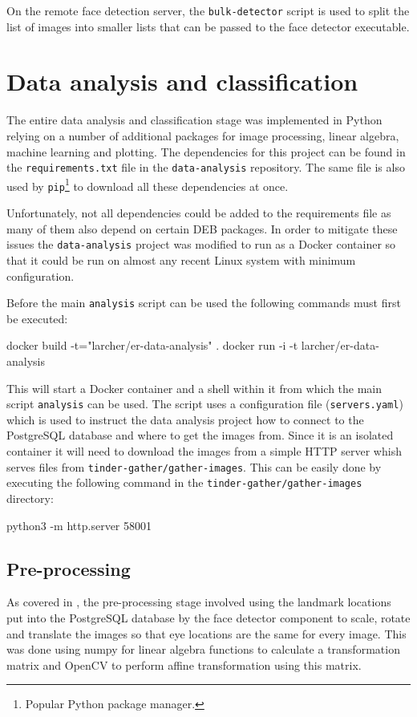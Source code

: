 On the remote face detection server, the \texttt{bulk-detector} script is used
to split the list of images into smaller lists that can be passed to the face
detector executable.

\section{Data analysis and classification}
The entire data analysis and classification stage was implemented in Python
relying on a number of additional packages for image processing, linear
algebra, machine learning and plotting. The dependencies for this project can
be found in the \texttt{requirements.txt} file in the \texttt{data-analysis}
repository. The same file is also used by \texttt{pip}\footnote{Popular Python
package manager.} to download all these dependencies at once.

Unfortunately, not all dependencies could be added to the requirements file as
many of them also depend on certain DEB packages. In order to mitigate these
issues the \texttt{data-analysis} project was modified to run as a Docker
\citep{docker} container so that it could be run on almost any recent Linux
system with minimum configuration.

Before the main \texttt{analysis} script can be used the following commands
must first be executed:
\begin{logs}
    docker build -t="larcher/er-data-analysis" . 
    docker run -i -t larcher/er-data-analysis
\end{logs}
This will start a Docker container and a shell within it from which the main
script \texttt{analysis} can be used. The script uses a configuration file
(\texttt{servers.yaml}) which is used to instruct the data analysis project how
to connect to the PostgreSQL database and where to get the images from. Since
it is an isolated container it will need to download the images from a simple
HTTP server whish serves files from \texttt{tinder-gather/gather-images}. This
can be easily done by executing the following command in the
\texttt{tinder-gather/gather-images} directory:
\begin{logs}
    python3 -m http.server 58001
\end{logs}

\subsection{Pre-processing}
As covered in , the pre-processing stage involved
using the landmark locations put into the PostgreSQL database by the face
detector component to scale, rotate and translate the images so that eye
locations are the same for every image. This was done using numpy for linear
algebra functions to calculate a transformation matrix and OpenCV to perform
affine transformation using this matrix.

